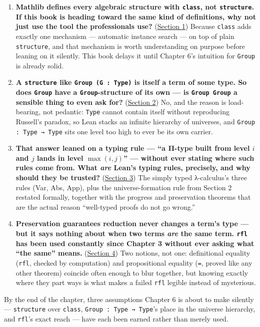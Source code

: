 \begin{enumerate}
\def\labelenumi{\arabic{enumi}.}
\tightlist
\item
  \textbf{Mathlib defines every algebraic structure with \texttt{class}, not \texttt{structure}. If this book is heading toward the same kind of definitions, why not just use the tool the professionals use?} (\hyperref[sec:05-rigor-check:01-structure-vs-class:1]{Section 1}) Because \texttt{class} adds exactly one mechanism --- automatic instance search --- on top of plain \texttt{structure}, and that mechanism is worth understanding on purpose before leaning on it silently. This book delays it until Chapter 6's intuition for \texttt{Group} is already solid.
\item
  \textbf{A \texttt{structure} like \texttt{Group (G : Type)} is itself a term of some type. So does \texttt{Group} have a \texttt{Group}-structure of its own --- is \texttt{Group Group} a sensible thing to even ask for?} (\hyperref[sec:05-rigor-check:02-universes:1]{Section 2}) No, and the reason is load-bearing, not pedantic: \texttt{Type} cannot contain itself without reproducing Russell's paradox, so Lean stacks an infinite hierarchy of universes, and \texttt{Group : Type → Type} sits one level too high to ever be its own carrier.
\item
  \textbf{That answer leaned on a typing rule --- ``a Π-type built from level \(i\) and \(j\) lands in level \(\max(i,j)\)'' --- without ever stating where such rules come from. What \emph{are} Lean's typing rules, precisely, and why should they be trusted?} (\hyperref[sec:05-rigor-check:03-typing-rules-and-safety:1]{Section 3}) The simply typed λ-calculus's three rules (Var, Abs, App), plus the universe-formation rule from Section 2 restated formally, together with the progress and preservation theorems that are the actual reason ``well-typed proofs do not go wrong.''
\item
  \textbf{Preservation guarantees reduction never changes a term's type --- but it says nothing about when two terms \emph{are} the same term. \texttt{rfl} has been used constantly since Chapter 3 without ever asking what ``the same'' means.} (\hyperref[sec:05-rigor-check:04-defeq-vs-propeq:1]{Section 4}) Two notions, not one: definitional equality (\texttt{rfl}, checked by computation) and propositional equality (\texttt{=}, proved like any other theorem) coincide often enough to blur together, but knowing exactly where they part ways is what makes a failed \texttt{rfl} legible instead of mysterious.
\end{enumerate}

By the end of the chapter, three assumptions Chapter 6 is about to make silently --- \texttt{structure} over \texttt{class}, \texttt{Group : Type → Type}'s place in the universe hierarchy, and \texttt{rfl}'s exact reach --- have each been earned rather than merely used.








